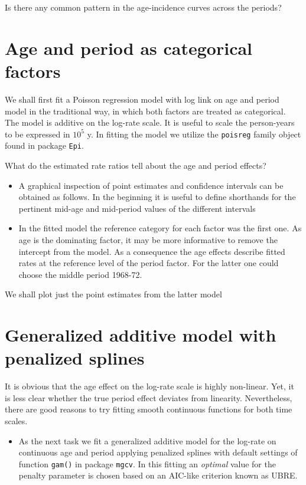 \documentclass[
]{book}
\providecommand{\tightlist}{%
  \setlength{\itemsep}{0pt}\setlength{\parskip}{0pt}}
\begin{document}
Is there any common pattern in the age-incidence curves across the periods?

\section{Age and period as categorical factors}\label{age-and-period-as-categorical-factors}

We shall first fit a Poisson regression model with log link
on age and period model in the traditional way,
in which both factors are treated as categorical.
The model is additive on the log-rate scale.
It is useful to scale the person-years to be expressed in \(10^5\) y.
In fitting the model we utilize the \texttt{poisreg} family object
found in package \texttt{Epi}.

What do the estimated rate ratios tell about the age and period effects?

\begin{itemize}
\item
  A graphical inspection of point estimates and confidence
  intervals can be obtained as follows. In the beginning it is useful
  to define shorthands for the pertinent mid-age and mid-period values
  of the different intervals
\item
  In the fitted model the reference category for each factor was
  the first one. As age is the dominating factor, it may be more
  informative to remove the intercept from the model. As a
  consequence the age effects describe fitted rates at the reference
  level of the period factor. For the latter one could choose the
  middle period 1968-72.
\end{itemize}

We shall plot just the point estimates from the latter model

\section{Generalized additive model with penalized splines}\label{generalized-additive-model-with-penalized-splines}

It is obvious that the age effect on the log-rate scale is highly
non-linear. Yet, it is less clear whether the true period effect
deviates from linearity. Nevertheless, there are good reasons to
try fitting smooth continuous functions for both time scales.

\begin{itemize}
\tightlist
\item
  As the next task we fit a generalized additive model for the
  log-rate on continuous age and period applying penalized splines
  with default settings of function \texttt{gam()} in package
  \texttt{mgcv}. In this fitting an \emph{optimal} value for the penalty
  parameter is chosen based on an AIC-like criterion known as UBRE.
\end{itemize}
\end{document}
